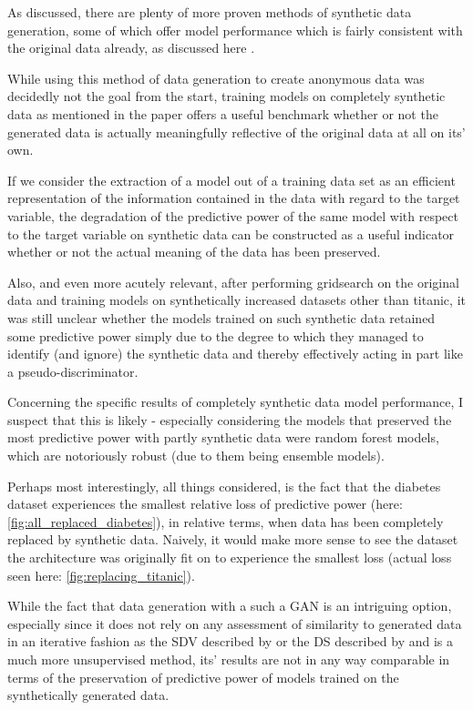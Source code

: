 As discussed, there are plenty of more proven methods of synthetic data generation, some of which offer model performance which is fairly consistent with the original data already, as discussed here \cite{ares_utility}.

While using this method of data generation to create anonymous data was decidedly not the goal from the start, training models on completely synthetic data as mentioned in the paper offers a useful benchmark whether or not the generated data is actually meaningfully reflective of the original data at all on its' own. 

If we consider the extraction of a model out of a training data set as an efficient representation of the information contained in the data with regard to the target variable, the degradation of the predictive power of the same model with respect to the target variable on synthetic data can be constructed as a useful indicator whether or not the actual meaning of the data has been preserved.

Also, and even more acutely relevant, after performing gridsearch on the original data and training models on synthetically increased datasets other than titanic, it was still unclear whether the models trained on such synthetic data retained some predictive power simply due to the degree to which they managed to identify (and ignore) the synthetic data and thereby effectively acting in part like a pseudo-discriminator.

Concerning the specific results of completely synthetic data model performance, I suspect that this is likely - especially considering the models that preserved the most predictive power with partly synthetic data were random forest models, which are notoriously robust (due to them being ensemble models).

\pagebreak

Perhaps most interestingly, all things considered, is the fact that the diabetes dataset experiences the smallest relative loss of predictive power (here: \ref{fig:all_replaced_diabetes}), in relative terms, when data has been completely replaced by synthetic data. Naively, it would make more sense to see the dataset the architecture was originally fit on to experience the smallest loss (actual loss seen here: \ref{fig:replacing_titanic}).

While the fact that data generation with a such a \ac{GAN} is an intriguing option, especially since it does not rely on any assessment of similarity to generated data in an iterative fashion as the \ac{SDV} described by \cite{patki2016synthetic} or the \ac{DS} described by \cite{ping2017datasynthesizer} and is a much more unsupervised method, its' results are not in any way comparable in terms of the preservation of predictive power of models trained on the synthetically generated data. 

